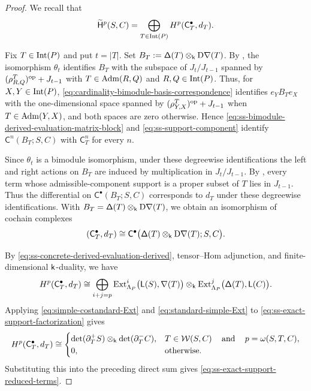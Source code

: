 \begin{proof}
We recall that 
\[
\widetilde{\mathsf H}^p(S,C)
=
\bigoplus_{T\in\operatorname{Int}(P)}
H^p(\mathsf C_T^\bullet,d_T).
\]

Fix $T\in\operatorname{Int}(P)$ and put $t=|T|$.
Set $B_T:=\mathsf\Delta(T)\otimes_{\mathsf{k}}\mathrm D\mathsf\nabla(T)$.
By ,
the isomorphism $\theta_t$ identifies $B_T$ with the subspace of
$J_t/J_{t-1}$ spanned by
$(\rho_{R,Q}^{T})^{\mathrm{op}}+J_{t-1}$ with
$T\in\operatorname{Adm}(R,Q)$ and $R,Q\in\operatorname{Int}(P)$.
Thus, for $X,Y\in\operatorname{Int}(P)$,
\eqref{eq:cardinality-bimodule-basis-correspondence} identifies
$e_YB_Te_X$ with the one-dimensional space spanned by
$(\rho_{Y,X}^{T})^{\mathrm{op}}+J_{t-1}$ when $T\in\operatorname{Adm}(Y,X)$, and both
spaces are zero otherwise.  Hence
\eqref{eq:ss-bimodule-derived-evaluation-matrix-block} and
\eqref{eq:ss-support-component} identify
$\mathsf C^n(B_T;S,C)$ with $\mathsf C_T^n$ for every $n$.

Since $\theta_t$ is a bimodule isomorphism, under these degreewise
identifications the left and right actions on $B_T$ are induced by
multiplication in $J_t/J_{t-1}$.  By
, every term whose
admissible-component support is a proper subset of $T$ lies in
$J_{t-1}$.  
Thus the differential on
$\mathsf C^\bullet(B_T;S,C)$ corresponds to $d_T$ under these
degreewise identifications. 
With $B_T=\mathsf\Delta(T)\otimes_{\mathsf{k}}\mathrm D\mathsf\nabla(T)$, we obtain an isomorphism of cochain complexes
\[
(\mathsf C_T^\bullet,d_T)
\cong
\mathsf C^\bullet
\bigl(
\mathsf\Delta(T)\otimes_{\mathsf{k}}\mathrm D\mathsf\nabla(T);S,C
\bigr).
\]

By \eqref{eq:ss-concrete-derived-evaluation-derived}, tensor--Hom
adjunction, and finite-dimensional $\mathsf{k}$-duality, we have
\begin{equation}
\label{eq:ss-exact-support-factorization}
H^p(\mathsf C_T^\bullet,d_T)
\cong
\bigoplus_{i+j=p}
\operatorname{Ext}_{\Lambda_P}^i\bigl(\mathsf L(S),\mathsf\nabla(T)\bigr)
\otimes_{\mathsf{k}}
\operatorname{Ext}_{\Lambda_P}^j\bigl(\mathsf\Delta(T),\mathsf L(C)\bigr).
\end{equation}
Applying \eqref{eq:simple-costandard-Ext} and
\eqref{eq:standard-simple-Ext} to
\eqref{eq:ss-exact-support-factorization} gives
\begin{equation}
\label{eq:ss-exact-support-diagonal-cohomology}
H^p(\mathsf C_T^\bullet,d_T)
\cong
\begin{cases}
\det(\partial_T^+S)\otimes_{\mathsf{k}}\det(\partial_T^-C),
&
T\in\mathcal W(S,C)
\operatorname{\quad \text{and} \quad}\nolimits
p=\omega(S,T,C),
\\
0,
&
\text{otherwise}.
\end{cases}
\end{equation}
Substituting this into the preceding direct sum gives
\eqref{eq:ss-exact-support-reduced-terms}.
\end{proof}


